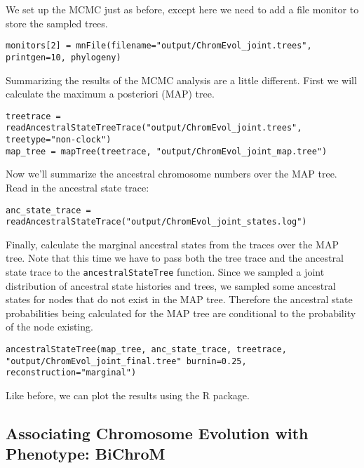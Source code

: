 We set up the MCMC just as before, except here we
need to add a file monitor to store the sampled trees.
{\tt \begin{snugshade*}
\begin{lstlisting}
monitors[2] = mnFile(filename="output/ChromEvol_joint.trees", printgen=10, phylogeny)
\end{lstlisting}
\end{snugshade*}}
Summarizing the results of the MCMC analysis are a little different.
First we will calculate the maximum a posteriori (MAP) tree.
{\tt \begin{snugshade*}
\begin{lstlisting}
treetrace = readAncestralStateTreeTrace("output/ChromEvol_joint.trees", treetype="non-clock")
map_tree = mapTree(treetrace, "output/ChromEvol_joint_map.tree")
\end{lstlisting}
\end{snugshade*}}
Now we'll summarize the ancestral chromosome numbers over the MAP tree.
Read in the ancestral state trace:
{\tt \begin{snugshade*}
\begin{lstlisting}
anc_state_trace = readAncestralStateTrace("output/ChromEvol_joint_states.log")
\end{lstlisting}
\end{snugshade*}}
Finally, calculate the marginal ancestral states from the traces over the MAP tree.
Note that this time we have to pass both the tree trace and the ancestral state
trace to the \texttt{ancestralStateTree} function.
Since we sampled a joint distribution of ancestral state histories and trees,
we sampled some ancestral states for nodes that do not exist in the MAP tree.
Therefore the ancestral state probabilities being calculated for the MAP tree
are conditional to the probability of the node existing.
{\tt \begin{snugshade*}
\begin{lstlisting}
ancestralStateTree(map_tree, anc_state_trace, treetrace, "output/ChromEvol_joint_final.tree" burnin=0.25, reconstruction="marginal")
\end{lstlisting}
\end{snugshade*}}
Like before, we can plot the results using the \RevGadgets R package.

\bigskip

\subsection{Associating Chromosome Evolution with Phenotype: BiChroM}\label{subsect:bichrom}

